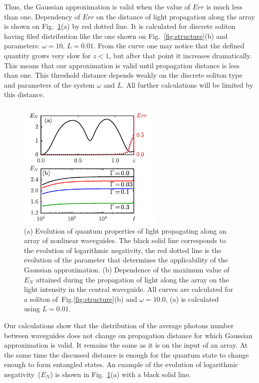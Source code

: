 \documentclass{osa-article}
\begin{document}
Thus, the Gaussian approximation is valid when the value of $Err$ is much less than one.
Dependency of $Err$ on the distance of light propagation along the array is shown on Fig.~\ref{fig:results}(a) by red dotted line. It is calculated for discrete soliton having filed distribution like the one shown on Fig.~\ref{fig:structure}(b) and parameters: $\omega = 10$, $L=0.01$.
From the curve one may notice that the defined quantity grows very slow for $z<1$, but after that point it increases dramatically.
This means that our approximation is valid until propagation distance is less than one.
This threshold distance depends weakly on the discrete soliton type and parameters of the system $\omega$ and $L$. 
All further calculations will be limited by this distance.
\par
\begin{figure}[h!]
	\centering\includegraphics[width=7cm]{fig3}
	\caption{(a) Evolution of quantum properties of light propagating along an array of nonlinear waveguides. 
		The black solid line corresponds to the evolution of logarithmic negativity, the red dotted line is the evolution of the parameter that determines the applicability of the Gaussian approximation. (b) Dependence of the maximum value of $E_N$ attained during the propagation of light along the array on the light intensity in the central waveguide. All curves are calculated for a soliton of~Fig.\ref{fig:structure}(b) and $\omega=10.0$, (a) is calculated using $L=0.01$.} 
	\label{fig:results}
\end{figure}
Our calculations show that the distribution of the average photons number between waveguides does not change on propagation distance for which Gaussian approximation is valid. 
It remains the same as it is on the input of an array. 
At the same time the discussed distance is enough for the quantum state to change enough to form entangled states.
An example of the evolution of logarithmic negativity~($E_N$) is shown in Fig.~\ref{fig:results}(a) with a black solid line.
\end{document}
